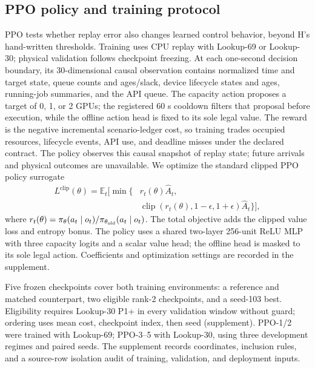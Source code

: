 \subsection{PPO policy and training protocol}
PPO tests whether replay error also changes learned control behavior, beyond
H's hand-written thresholds. Training uses CPU replay with Lookup-69 or
Lookup-30; physical validation follows checkpoint freezing. At each one-second decision boundary, its 30-dimensional
causal observation contains normalized time and target state, queue counts and
ages/slack, device lifecycle states and ages, running-job summaries, and the API
queue. The capacity action proposes a target of 0, 1, or 2 GPUs; the registered
60 s cooldown filters that proposal before execution, while the offline action
head is fixed to its sole legal value. The reward is the negative incremental
scenario-ledger cost, so training trades occupied resources, lifecycle events,
API use, and deadline misses under the declared contract. The policy observes this causal snapshot of replay state;
future arrivals and physical outcomes are unavailable. We optimize the standard clipped PPO policy surrogate
\begin{equation}
\begin{aligned}
 L^{\mathrm{clip}}(\theta)=\mathbb{E}_t\big[\min\{&r_t(\theta)\widehat A_t,\\
 &\operatorname{clip}(r_t(\theta),1-\epsilon,1+\epsilon)\widehat A_t\}\big],
\end{aligned}
 \label{eq:ppo-clip}
\end{equation}
where $r_t(\theta)=\pi_\theta(a_t\mid o_t)/\pi_{\theta_{\rm old}}(a_t\mid o_t)$.
The total objective adds the clipped value loss and entropy bonus. The policy
uses a shared two-layer 256-unit ReLU MLP with three capacity logits and a
scalar value head; the offline head is masked to its sole legal action.
Coefficients and optimization settings are recorded in the supplement.

Five frozen checkpoints cover both training environments: a reference and
matched counterpart, two eligible rank-2 checkpoints, and a seed-103 best.
Eligibility requires Lookup-30 P1+ in every validation window without guard;
ordering uses mean cost, checkpoint index, then seed (supplement).
PPO-1/2 were trained with Lookup-69; PPO-3--5 with Lookup-30, using three development
regimes and paired seeds. The supplement records coordinates, inclusion rules,
and a source-row isolation audit of training, validation, and deployment inputs.

